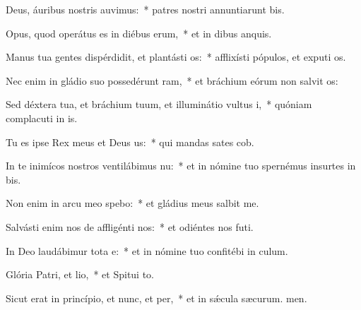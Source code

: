 \item Deus, áuribus nostris auvimus:~* patres nostri annuntiarunt bis.
\item Opus, quod operátus es in diébus erum,~* et in dibus anquis.
\item Manus tua gentes dispérdidit, et plantásti os:~* afflixísti pópulos, et exputi os.
\item Nec enim in gládio suo possedérunt ram,~* et bráchium eórum non salvit os:
\item Sed déxtera tua, et bráchium tuum, et illuminátio vultus i,~* quóniam complacuti in is.
\item Tu es ipse Rex meus et Deus us:~* qui mandas sates cob.
\item In te inimícos nostros ventilábimus nu:~* et in nómine tuo spernémus insurtes in bis.
\item Non enim in arcu meo spebo:~* et gládius meus  salbit me.
\item Salvásti enim nos de affligénti nos:~* et odiéntes nos futi.
\item In Deo laudábimur tota e:~* et in nómine tuo confitébi in culum.
\item Glória Patri, et lio,~* et Spitui to.
\item Sicut erat in princípio, et nunc, et per,~* et in sǽcula sæcurum. men.
